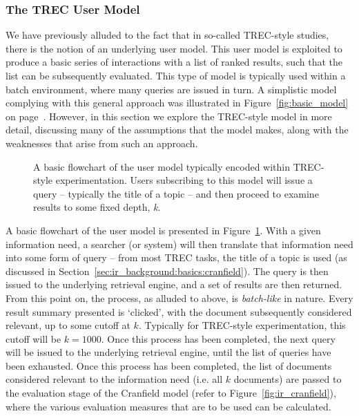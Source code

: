 \subsubsection{The TREC User Model}\label{sec:stopping_background:models:conceptual:trec}
We have previously alluded to the fact that in so-called TREC-style studies, there is the notion of an underlying user model. This user model is exploited to produce a basic series of interactions with a list of ranked results, such that the list can be subsequently evaluated. This type of model is typically used within a batch environment, where many queries are issued in turn. A simplistic model complying with this general approach was illustrated in Figure~\ref{fig:basic_model} on page~\pageref{fig:basic_model}. However, in this section we explore the TREC-style model in more detail, discussing many of the assumptions that the model makes, along with the weaknesses that arise from such an approach.

\begin{figure}[t!]
    \centering
    \caption[The TREC-style user model]{A basic flowchart of the user model typically encoded within TREC-style experimentation. Users subscribing to this model will issue a query – typically the title of a topic – and then proceed to examine results to some fixed depth, \emph{k}.}
    \label{fig:trec_model}
\end{figure}

A basic flowchart of the user model is presented in Figure~\ref{fig:trec_model}. With a given information need, a searcher (or system) will then translate that information need into some form of query -- from most TREC tasks, the title of a topic is used (as discussed in Section~\ref{sec:ir_background:basics:cranfield}). The query is then issued to the underlying retrieval engine, and a set of results are then returned. From this point on, the process, as alluded to above, is \emph{batch-like} in nature. Every result summary presented is `clicked', with the document subsequently considered relevant, up to some cutoff at $k$. Typically for TREC-style experimentation, this cutoff will be $k=1000$. Once this process has been completed, the next query will be issued to the underlying retrieval engine, until the list of queries have been exhausted. Once this process has been completed, the list of documents considered relevant to the information need (i.e. all $k$ documents) are passed to the evaluation stage of the Cranfield model (refer to Figure~\ref{fig:ir_cranfield}), where the various evaluation measures that are to be used can be calculated.

